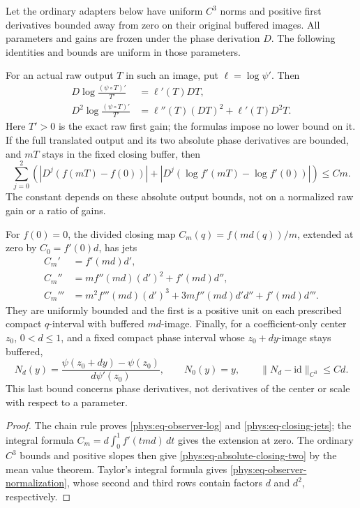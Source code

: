 \begin{lemma}\label{phys:lem-c3-adapters}
Let the ordinary adapters below have uniform \(C^3\) norms and positive
first derivatives bounded away from zero on their original buffered
images. All parameters and gains are frozen under the phase derivation
\(D\). The following identities and bounds are uniform in those
parameters.

For an actual raw output \(T\) in such an image, put
\(\ell=\log\psi'\). Then
\begin{equation}\label{phys:eq-observer-log}
 \begin{aligned}
 D\log\frac{(\psi\circ T)'}{T'}&=\ell'(T)DT,\\
 D^2\log\frac{(\psi\circ T)'}{T'}
 &=\ell''(T)(DT)^2+\ell'(T)D^2T .
 \end{aligned}
\end{equation}
Here \(T'>0\) is the exact raw first gain; the formulas impose no lower
bound on it. If the full translated output and its two absolute phase
derivatives are bounded, and \(mT\) stays in the fixed closing buffer,
then
\begin{equation}\label{phys:eq-absolute-closing-two}
 \sum_{j=0}^2\left(
 |D^j(f(mT)-f(0))|
 +|D^j(\log f'(mT)-\log f'(0))|\right)\le C m.
\end{equation}
The constant depends on these absolute output bounds, not on a
normalized raw gain or a ratio of gains.

For \(f(0)=0\), the divided closing map \(C_m(q)=f(md(q))/m\),
extended at zero by \(C_0=f'(0)d\), has jets
\begin{equation}\label{phys:eq-closing-jets}
 \begin{aligned}
 C_m'&=f'(md)d',\\
 C_m''&=m f''(md)(d')^2+f'(md)d'',\\
 C_m'''&=m^2f'''(md)(d')^3
       +3m f''(md)d'd''+f'(md)d''' .
 \end{aligned}
\end{equation}
They are uniformly bounded and the first is a positive unit on each
prescribed compact \(q\)-interval with buffered \(md\)-image.
Finally, for a coefficient-only center \(z_0\), \(0<d\le1\), and a
fixed compact phase interval whose \(z_0+dy\)-image stays buffered,
\begin{equation}\label{phys:eq-observer-normalization}
 N_d(y)=\frac{\psi(z_0+dy)-\psi(z_0)}{d\psi'(z_0)},\qquad
 N_0(y)=y,\qquad \|N_d-\mathrm{id}\|_{C^3}\le C d.
\end{equation}
This last bound concerns phase derivatives, not derivatives of the
center or scale with respect to a parameter.
\end{lemma}
\begin{proof}
The chain rule proves \eqref{phys:eq-observer-log} and
\eqref{phys:eq-closing-jets}; the integral formula
\(C_m=d\int_0^1f'(tmd)\,dt\) gives the extension at zero.
The ordinary \(C^3\) bounds and positive slopes then give
\eqref{phys:eq-absolute-closing-two} by the mean value theorem.
Taylor's integral formula gives
\eqref{phys:eq-observer-normalization}, whose second and third
rows contain factors \(d\) and \(d^2\), respectively.
\end{proof}


